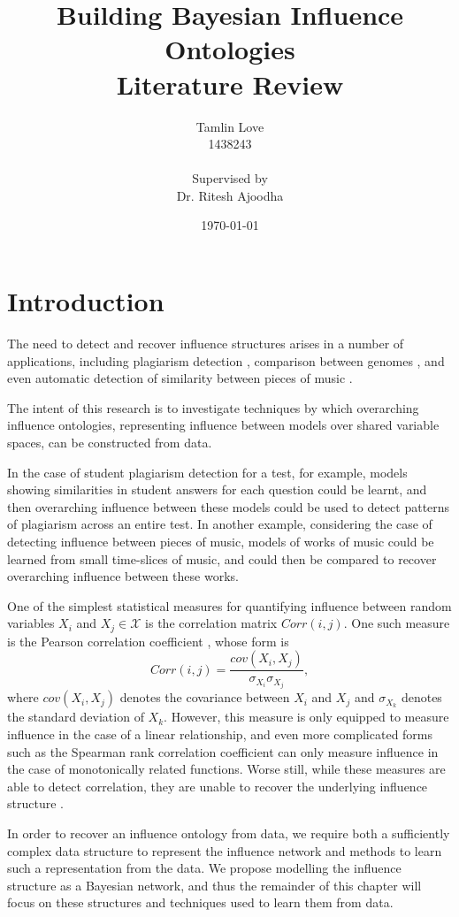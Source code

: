 \documentclass [11pt]{article}
\title{Building Bayesian Influence Ontologies\\Literature Review}
\author{Tamlin Love\\1438243\\\\Supervised by\\Dr. Ritesh Ajoodha}
\date{\today}
\begin{document}
\maketitle
\section{Introduction}
The need to detect and recover influence structures arises in a number of applications, including plagiarism detection \citep{merlo2007}, comparison between genomes \citep{koonin1999}, and even automatic detection of similarity between pieces of music \citep{slaney2008}.

The intent of this research is to investigate techniques by which overarching influence ontologies, representing influence between models over shared variable spaces, can be constructed from data.

In the case of student plagiarism detection for a test, for example, models showing similarities in student answers for each question could be learnt, and then overarching influence between these models could be used to detect patterns of plagiarism across an entire test. In another example, considering the case of detecting influence between pieces of music, models of works of music could be learned from small time-slices of music, and could then be compared to recover overarching influence between these works.

One of the simplest statistical measures for quantifying influence between random variables $X_{i}$ and $X_{j} \in \mathcal{X}$ is the correlation matrix $Corr(i,j)$. One such measure is the Pearson correlation coefficient \citep{pearson1895}, whose form is
\begin{equation*}
Corr(i,j) = \frac{cov(X_{i},X_{j})}{\sigma_{X_{i}} \sigma_{X_{j}}},
\end{equation*}
where $cov(X_{i},X_{j})$ denotes the covariance between $X_{i}$ and $X_{j}$ and $\sigma_{X_{k}}$ denotes the standard deviation of $X_{k}$. However, this measure is only equipped to measure influence in the case of a linear relationship, and even more complicated forms such as the Spearman rank correlation coefficient \citep{spearman1904} can only measure influence in the case of monotonically related functions. Worse still, while these measures are able to detect correlation, they are unable to recover the underlying influence structure \citep{damghani2012}.

In order to recover an influence ontology from data, we require both a sufficiently complex data structure to represent the influence network and methods to learn such a representation from the data. We propose modelling the influence structure as a Bayesian network, and thus the remainder of this chapter will focus on these structures and techniques used to learn them from data.
\end{document}
